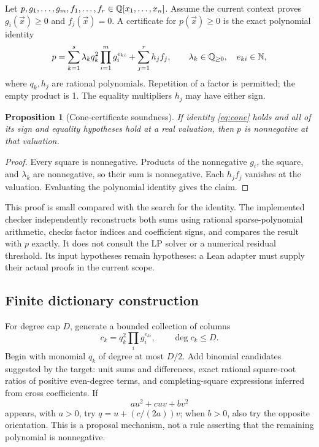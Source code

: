 \documentclass[11pt,a4paper]{article}
\newtheorem{proposition}{Proposition}[section]
\begin{document}
Let $p,g_1,\ldots,g_m,f_1,\ldots,f_r\in\mathbb{Q}[x_1,\ldots,x_n]$.
Assume the current context proves $g_i(\vec x)\geq0$ and
$f_j(\vec x)=0$. A certificate for $p(\vec x)\geq0$ is the exact polynomial
identity
\begin{equation}\label{eq:cone}
 p=\sum_{k=1}^{s}\lambda_k q_k^2\prod_{i=1}^{m}g_i^{e_{ki}}
   +\sum_{j=1}^{r}h_j f_j,
 \qquad \lambda_k\in\mathbb{Q}_{\geq0},\quad e_{ki}\in\mathbb{N},
\end{equation}
where $q_k,h_j$ are rational polynomials. Repetition of a factor is permitted;
the empty product is 1. The equality multipliers $h_j$ may have either sign.

\begin{proposition}[Cone-certificate soundness]\label{prop:cone}
If identity \eqref{eq:cone} holds and all of its sign and equality hypotheses
hold at a real valuation, then $p$ is nonnegative at that valuation.
\end{proposition}
\begin{proof}
Every square is nonnegative. Products of the nonnegative $g_i$, the square,
and $\lambda_k$ are nonnegative, so their sum is nonnegative. Each $h_jf_j$
vanishes at the valuation. Evaluating the polynomial identity gives the claim.
\end{proof}

This proof is small compared with the search for the identity. The implemented
checker independently reconstructs both sums using rational sparse-polynomial
arithmetic, checks factor indices and coefficient signs, and compares the
result with $p$ exactly. It does not consult the LP solver or a numerical
residual threshold. Its input hypotheses remain hypotheses: a Lean adapter
must supply their actual proofs in the current scope.

\subsection{Finite dictionary construction}

For degree cap $D$, generate a bounded collection of columns
\[
 c_k=q_k^2\prod_i g_i^{e_{ki}},\qquad \deg c_k\leq D.
\]
Begin with monomial $q_k$ of degree at most $D/2$. Add binomial candidates
suggested by the target: unit sums and differences, exact rational square-root
ratios of positive even-degree terms, and completing-square expressions
inferred from cross coefficients. If
\[
 a u^2+cuv+bv^2
\]
appears, with $a>0$, try $q=u+(c/(2a))v$; when $b>0$, also try the opposite
orientation. This is a proposal mechanism, not a rule asserting that the
remaining polynomial is nonnegative.
\end{document}
